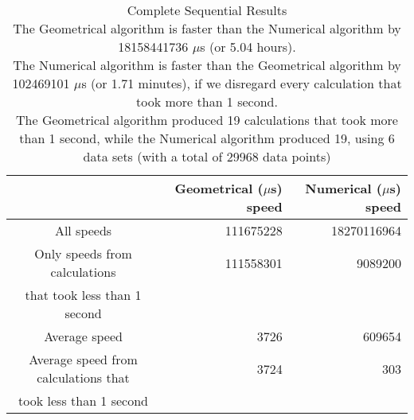 \begin{table}[bth!]\footnotesize
 \begin{tabular}[3]{c|r|r}
 & Geometrical ($\mu$s) speed & Numerical ($\mu$s) speed\\
\hline
All speeds & 111675228 & 18270116964 \\ 
\hline 
Only speeds from calculations & 111558301 & 9089200 \\ 
that took less than 1 second & & \\ 
\hline
Average speed & 3726 & 609654 \\
\hline
Average speed from calculations that & 3724 & 303 \\ 
took less than 1 second & & \\ 
\end{tabular}\\ \\
\caption{Complete Sequential Results\\
The Geometrical algorithm is faster than the Numerical algorithm by 18158441736 $\mu$s (or 5.04 hours).\\
The Numerical algorithm is faster than the Geometrical algorithm by 102469101 $\mu$s (or 1.71 minutes), if we disregard every calculation that took more than 1 second.\\
The Geometrical algorithm produced 19 calculations that took more than 1 second, while the Numerical algorithm produced 19, using 6 data sets (with a total of 29968 data points)\\
}\label{sequential_speedtable}\end{table}